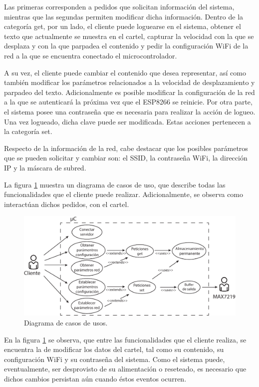 Las primeras corresponden a pedidos que solicitan información del sistema, mientras que las segundas permiten modificar dicha información.
Dentro de la categoría get, por un lado, el cliente puede loguearse en el sistema, obtener el texto que actualmente se muestra en el cartel, capturar la velocidad con la que se desplaza y con la que parpadea el contenido y pedir la configuración WiFi de la red a la que se encuentra conectado el microcontrolador.

A su vez, el cliente puede cambiar el contenido que desea representar, así como también modificar los parámetros relacionados a la velocidad de desplazamiento y parpadeo del texto.
Adicionalmente es posible modificar la configuración de la red a la que se autenticará la próxima vez que el ESP8266 se reinicie.
Por otra parte, el sistema posee una contraseña que es necesaria para realizar la acción de logueo.
Una vez logueado, dicha clave puede ser modificada. Estas acciones pertenecen a la categoría set.

Respecto de la información de la red, cabe destacar que los posibles parámetros que se pueden solicitar y cambiar son: el SSID, la contraseña WiFi, la dirección IP y la máscara de subred.

La figura \ref{fig:diagrama_casos_de_uso} muestra un diagrama de casos de uso, que describe todas las funcionalidades que el cliente puede realizar.
Adicionalmente, se observa como interactúan dichos pedidos, con el cartel.

\begin{figure}[!ht]
	\centering
	\includegraphics[width=1\linewidth]{imagenes/sistema-caso-de-uso.pdf}
	\caption{Diagrama de casos de usos.}
	\label{fig:diagrama_casos_de_uso}
\end{figure}

En la figura \ref{fig:diagrama_casos_de_uso} se observa, que entre las funcionalidades que el cliente realiza, se encuentra la de modificar los datos del cartel, tal como su contenido, su configuración WiFi y su contraseña del sistema.
Como el sistema puede, eventualmente, ser desprovisto de su alimentación o reseteado, es necesario que dichos cambios persistan aún cuando éstos eventos ocurren.

